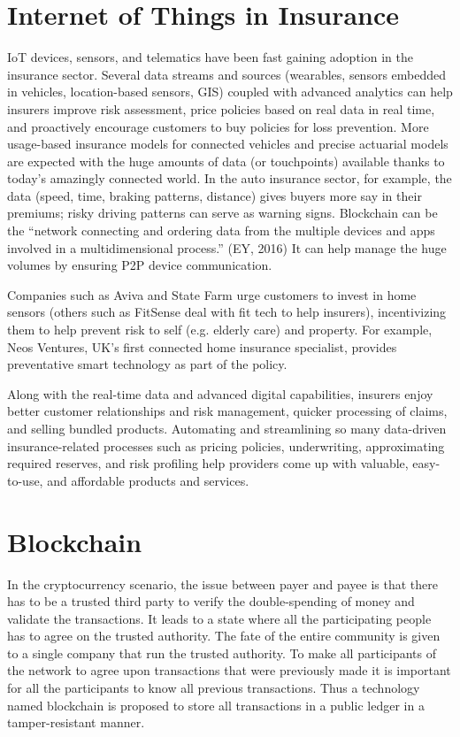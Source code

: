 \section{Internet of Things in Insurance}
\lipsum[]
IoT devices, sensors, and telematics have been fast gaining adoption in the insurance sector. Several data streams and sources (wearables, sensors embedded in vehicles, location-based sensors, GIS) coupled with advanced analytics can help insurers improve risk assessment, price policies based on real data in real time, and proactively encourage customers to buy policies for loss prevention. More usage-based insurance models for connected vehicles and precise actuarial models are expected with the huge amounts of data (or touchpoints) available thanks to today’s amazingly connected world. In the auto insurance sector, for example, the data (speed, time, braking patterns, distance) gives buyers more say in their premiums; risky driving patterns can serve as warning signs. Blockchain can be the “network connecting and ordering data from the multiple devices and apps involved in a multidimensional process.” (EY, 2016) It can help manage the huge volumes by ensuring P2P device communication.

Companies such as Aviva and State Farm urge customers to invest in home sensors (others such as FitSense deal with fit tech to help insurers), incentivizing them to help prevent risk to self (e.g. elderly care) and property. For example, Neos Ventures, UK’s first connected home insurance specialist, provides preventative smart technology as part of the policy.

Along with the real-time data and advanced digital capabilities, insurers enjoy better customer relationships and risk management, quicker processing of claims, and selling bundled products. Automating and streamlining so many data-driven insurance-related processes such as pricing policies, underwriting, approximating required reserves, and risk profiling help providers come up with valuable, easy-to-use, and affordable products and services.

\section{Blockchain}
\lipsum[]
In the cryptocurrency scenario, the issue between payer and payee is that there has to be a trusted third party to verify the double-spending of money and validate the transactions. It leads to a state where all the participating people has to agree on the trusted authority. The fate of the entire community is given to a single company that run the trusted authority. To make all participants of the network to agree upon transactions that were previously made it is important for all the participants to know all previous transactions. Thus a technology named blockchain is proposed to store all transactions in a public ledger in a tamper-resistant manner. 

